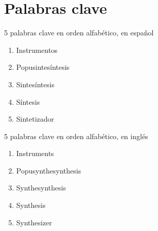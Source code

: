 \documentclass[../proyecto.tex]{subfiles}
\begin{document}
\chapter{Palabras clave}

5 palabras clave en orden alfabético, en español

\begin{enumerate}
    \item Instrumentos
    \item Popusintesíntesis
    \item Sintesíntesis
    \item Síntesis
    \item Sintetizador
\end{enumerate}

5 palabras clave en orden alfabético, en inglés

\begin{enumerate}
    \item Instruments
    \item Popusynthesynthesis
    \item Synthesynthesis
    \item Synthesis
    \item Synthesizer
\end{enumerate}
\end{document}
